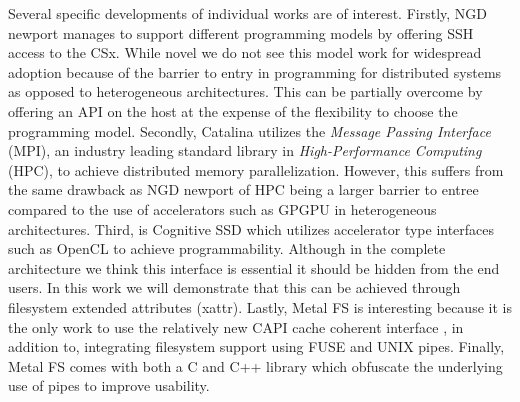 Several specific developments of individual works are of interest. Firstly,
NGD newport \cite{10.1145/3415580} manages to support different programming
models by offering SSH access to the CSx. While novel we do not see this model
work for widespread adoption because of the barrier to entry in programming for
distributed systems as opposed to heterogeneous architectures. This can be
partially overcome by offering an API on the host at the expense of the
flexibility to choose the programming model. Secondly, Catalina
\cite{8855540} utilizes the \textit{Message Passing Interface} (MPI), an
industry leading standard library in \textit{High-Performance Computing} (HPC),
to achieve distributed memory parallelization. However, this suffers from the
same drawback as NGD newport of HPC being a larger barrier to entree compared to
the use of accelerators such as GPGPU in heterogeneous architectures. Third,
is Cognitive SSD \cite{8839401} which utilizes accelerator type interfaces such
as OpenCL to achieve programmability. Although in the complete architecture we
think this interface is essential it should be hidden from the end users. In
this work we will demonstrate that this can be achieved through filesystem
extended attributes (xattr). Lastly, Metal FS \cite{10.1145/3342195.3387557}
is interesting because it is the only work to use the relatively new CAPI
cache coherent interface \cite{Stuecheli2015CAPIAC}, in addition to, 
integrating filesystem support using FUSE and UNIX pipes. Finally, Metal FS
comes with both a C and C++ library which obfuscate the underlying use of pipes
to improve usability.

